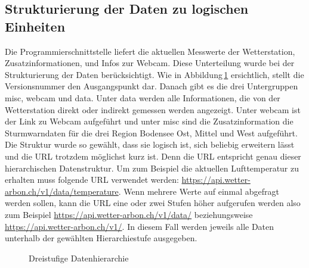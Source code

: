 \subsection{Strukturierung der Daten zu logischen Einheiten}
Die Programmierschnittstelle liefert die aktuellen Messwerte der Wetterstation, Zusatzinformationen, und Infos zur Webcam. Diese Unterteilung wurde bei der Strukturierung der Daten berücksichtigt.
Wie in Abbildung\,\ref{img:hierarchie} ersichtlich, stellt die Versionsnummer den Ausgangspunkt dar. Danach gibt es die drei Untergruppen misc, webcam und data. Unter data werden alle Informationen, die von der Wetterstation direkt oder indirekt gemessen werden angezeigt. Unter webcam ist der Link zu Webcam aufgeführt und unter misc sind die Zusatzinformation die Sturmwarndaten für die drei Region Bodensee Ost, Mittel und West aufgeführt. Die Struktur wurde so gewählt, dass sie logisch ist, sich beliebig erweitern lässt und die URL trotzdem möglichst kurz ist. Denn die URL entspricht genau dieser hierarchischen Datenstruktur. Um zum Beispiel die aktuellen Lufttemperatur zu erhalten muss folgende URL verwendet werden: \url{https://api.wetter-arbon.ch/v1/data/temperature}. Wenn mehrere Werte auf einmal abgefragt werden sollen, kann die URL eine oder zwei Stufen höher aufgerufen werden also zum Beispiel \url{https://api.wetter-arbon.ch/v1/data/} beziehungsweise \url{https://api.wetter-arbon.ch/v1/}. In diesem Fall werden jeweils alle Daten unterhalb der gewählten Hierarchiestufe ausgegeben.


\begin{figure}[htbp!]
	\centering
	\caption{Dreistufige Datenhierarchie}
	\label{img:hierarchie}
\end{figure}

